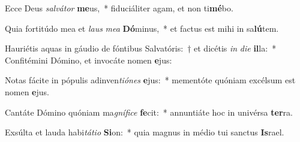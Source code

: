 \item Ecce Deus \textit{sal}\textit{vá}\textit{tor} \textbf{me}us,~* fiduciáliter agam, et non ti\textbf{mé}bo.
\item Quia fortitúdo mea et \textit{laus} \textit{me}\textit{a} \textbf{Dó}minus,~* et factus est mihi in sa\textbf{lú}tem.
\item Hauriétis aquas in gáudio de fóntibus Salvatóris:~† et dicétis \textit{in} \textit{di}\textit{e} \textbf{il}la:~* Confitémini Dómino, et invocáte nomen \textbf{e}jus:
\item Notas fácite in pópulis adinven\textit{ti}\textit{ó}\textit{nes} \textbf{e}jus:~* mementóte quóniam excélsum est nomen \textbf{e}jus.
\item Cantáte Dómino quóniam ma\textit{gní}\textit{fi}\textit{ce} \textbf{fe}cit:~* annuntiáte hoc in univérsa \textbf{ter}ra.
\item Exsúlta et lauda habi\textit{tá}\textit{ti}\textit{o} \textbf{Si}on:~* quia magnus in médio tui sanctus \textbf{Is}rael.
